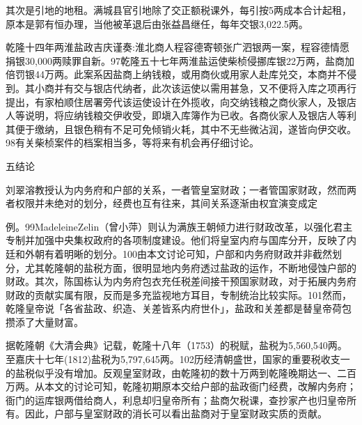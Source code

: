 其次是引地的地租。满城县官引地除了交正额税课外，每引按5两成本合计起租，原本是郭有恒办理，当他被革退后由张益昌继任，每年交银3,022.5两。

乾隆十四年两淮盐政吉庆谨奏:淮北商人程容德寄顿张广泗银两一案，程容德情愿捐银30,000两赎罪自新。97乾隆五十七年两淮盐运使柴桢侵挪库银22万两，盐商加倍罚银44万两。此案系因盐商上纳钱粮，或用商伙或用家人赴库兑交，本商并不侵到。其小商并有交与银店代纳者，此次该运使以需用甚急，又不便将入库之项再行提出，有家柏顺住居署旁代该运使设计在外揽收，向交纳钱粮之商伙家人，及银店人等说明，将应纳钱粮交伊收受，即塡入库簿作为已收。各商伙家人及银店人等利其便于缴纳，且银色稍有不足可免倾销火耗，其中不无些微沾润，遂皆向伊交收。98有关柴桢案件的档案相当多，等将来有机会再仔细讨论。

五结论

刘翠溶教授认为内务府和户部的关系，一者管皇室财政；一者管国家财政，然而两者权限并未绝对的划分，经费也互有往来，其间关系逐渐由权宜演变成定

\vfill
\begin{BookNotes}
\end{BookNotes}

\noindent 例。99MadeleineZelin（曾小萍）则认为满族王朝倾力进行财政改革，以强化君主专制并加强中央集权政府的各项制度建设。他们将皇室内府与国库分开，反映了内廷和外朝有着明晰的划分。100由本文讨论可知，户部和内务府财政并非截然划分，尤其乾隆朝的盐税方面，很明显地内务府透过盐政的运作，不断地侵蚀户部的财政。其次，陈国栋认为内务府包衣充任税差间接干预国家财政，对于拓展内务府财政的贡献实属有限，反而是多充监视地方耳目，专制统治比较实际。101然而，乾隆皇帝说「各省盐政、织造、关差皆系内府世仆」，盐政和关差都是替皇帝荷包攒添了大量财富。

据乾隆朝《大清会典》记载，乾隆十八年（1753）的税赋，盐税为5,560,540两。至嘉庆十七年(1812)盐税为5,797,645两。102历经清朝盛世，国家的重要税收支一的盐税似乎没有增加。反观皇室财政，由乾隆初的数十万两到乾隆晚期达一、二百万两。从本文的讨论可知，乾隆初期原本交给户部的盐政衙门经费，改解内务府；衙门的运库银两借给商人，利息却归皇帝所有；盐商欠税课，查抄家产也归皇帝所有。因此，户部与皇室财政的消长可以看出盐商对于皇室财政实质的贡献。


